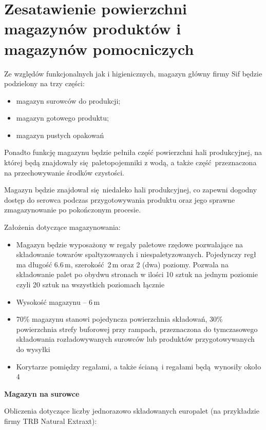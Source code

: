 \section{Zesatawienie powierzchni magazynów produktów i magazynów pomocniczych}

Ze względów funkcjonalnych jak i higienicznych, magazyn główny firmy \textsf{Sif} będzie podzielony na trzy części:
\begin{itemize}
	\item magazyn surowców do produkcji;
	\item magazyn gotowego produktu;
	\item magazyn pustych opakowań
\end{itemize}

Ponadto funkcję magazynu będzie pełniła część powierzchni hali produkcyjnej, na której będą znajdowały się paletopojemniki z wodą, a także część przeznaczona na przechowywanie środków czystości.

Magazyn będzie znajdował się niedaleko hali produkcyjnej, co zapewni dogodny dostęp do serowca podczas przygotowywania produktu oraz jego sprawne zmagazynowanie po pokończonym procesie.

Założenia dotyczące magazynowania:
\begin{itemize}
	\item Magazyn będzie wyposażony w regały paletowe rzędowe pozwalające na składowanie towarów spaltyzowanych i niespaletyzowanych. Pojedynczy regł ma długość 6.6\,m, szerokość 2\,m oraz 2 (dwa) poziomy. Pozwala na składowanie palet po obydwu stronach w ilości 10 sztuk na jednym poziomie czyli 20 sztuk na wszystkich poziomach łącznie
	\item Wysokość magazynu -- 6\,m
	\item 70\% magazynu stanowi pojedyncza powierzchnia składowań, 30\% powierzchnia strefy buforowej przy rampach, przeznaczona do tymczasowego składowania rozładowywanych surowców lub produktów przygotowywanych do wysyłki
	\item Korytarze pomiędzy regałami, a także ścianą i regałami będą wynosiły około 4\,
\end{itemize}\vspace{\baselineskip}

\textbf{Magazyn na surowce}

Obliczenia dotyczące liczby jednorazowo składowanych europalet (na przykładzie firmy \textsf{TRB Natural Extraxt}):

